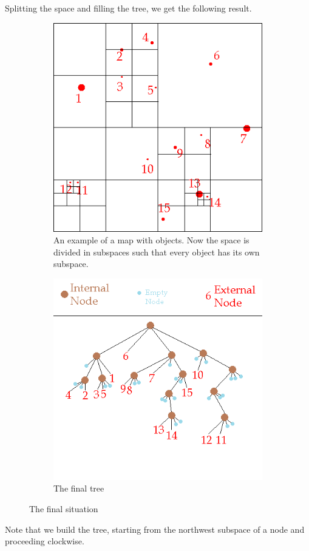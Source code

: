Splitting the space and filling the tree, we get the following result.
\begin{figure}[H]
\centering
\begin{subfigure}{0.35\textwidth}
\includegraphics[width=\textwidth]{barneshut_map_devided.png}
\caption{An example of a map with objects. Now the space is divided in subspaces such that every object has its own subspace.}
\end{subfigure}\hspace{1cm}
\begin{subfigure}{0.35\textwidth}
\includegraphics[width=\textwidth]{barneshut_tree.png}
\caption{The final tree}
\end{subfigure}
\caption{The final situation}
\end{figure}
Note that we build the tree, starting from the northwest subspace of a node and proceeding clockwise.\\

